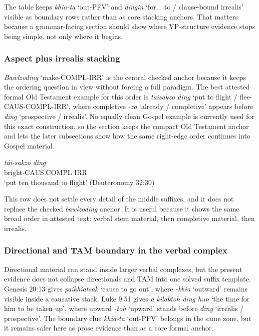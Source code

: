 \documentclass[
  11pt,
  a4paper,
]{article}
\newcommand{\tdim}[1]{\textit{#1}}
\newcommand{\tdimword}[1]{\textit{#1}}
\renewcommand{\textsc}[1]{{\footnotesize\MakeUppercase{#1}}}
\newcommand{\glossquote}[1]{`#1'}
\begin{document}
The table keeps \tdim{khia-ta} \glossquote{out-PFV} and \tdim{dingin}
\glossquote{for... to / clause-bound irrealis} visible as boundary rows
rather than as core stacking anchors. That matters because a
grammar-facing section should show where VP-structure evidence stops
being simple, not only where it begins.

\subsubsection{Aspect plus irrealis
stacking}\label{aspect-plus-irrealis-stacking}

\tdim{Bawlzoding} \glossquote{make-COMPL-IRR} is the central checked
anchor because it keeps the ordering question in view without forcing a
full paradigm. The best attested formal Old Testament example for this
order is \tdim{taisakzo ding}
\glossquote{put to flight / flee-CAUS-COMPL-IRR}, where completive
\tdim{-zo} \glossquote{already / completive} appears before \tdim{ding}
\glossquote{prospective / irrealis}. No equally clean Gospel example is
currently used for this exact construction, so the section keeps the
compact Old Testament anchor and lets the later subsections show how the
same right-edge order continues into Gospel material.

\begin{exe}
\ex \label{ex:vp-taisakzo-ding-deut32}
\gll \tdimword{tái-sakzo} \tdimword{dìng} \\
     bright-\textsc{caus}.\textsc{compl} \textsc{irr} \\
\glt \glossquote{put ten thousand to flight} (Deuteronomy 32:30)
\end{exe}

This row does not settle every detail of the middle suffixes, and it
does not replace the checked \tdim{bawlzoding} anchor. It is useful
because it shows the same broad order in attested text: verbal stem
material, then completive material, then irrealis.

\subsubsection{Directional and TAM boundary in the verbal
complex}\label{directional-and-tam-boundary-in-the-verbal-complex}

Directional material can stand inside larger verbal complexes, but the
present evidence does not collapse directionals and TAM into one solved
suffix template. Genesis 20:13 gives \tdim{paikhiatsak}
\glossquote{cause to go out}, where \tdim{-khia} \glossquote{outward}
remains visible inside a causative stack. Luke 9:51 gives
\tdim{a kilaktoh ding hun} \glossquote{the time for him to be taken up},
where upward \tdim{-toh} \glossquote{upward} stands before \tdim{ding}
\glossquote{irrealis / prospective}. The boundary clue \tdim{khia-ta}
\glossquote{out-PFV} belongs in the same zone, but it remains safer here
as prose evidence than as a core formal anchor.
\end{document}
